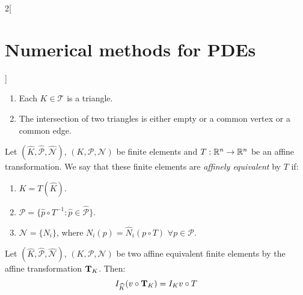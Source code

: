 \documentclass[../../../main_math.tex]{subfiles}
\begin{document}
\begin{multicols}{2}[\section{Numerical methods for PDEs}]
\begin{definition}
    \begin{enumerate}
      \item Each $K\in\mathcal{T}$ is a triangle.
      \item The intersection of two triangles is either empty or a common vertex or a common edge.
    \end{enumerate}
  \end{definition}
  \begin{definition}
    Let $(\widehat{K}, \widehat{\mathcal{P}}, \widehat{\mathcal{N}})$, $(K,\mathcal{P},\mathcal{N})$ be finite elements and $T:\mathbb{R}^n\to\mathbb{R}^n$ be an affine transformation. We say that these finite elements are \emph{affinely equivalent} by $T$ if:
    \begin{enumerate}
      \item $K=T(\widehat{K})$.
      \item $\mathcal{P}=\{\widehat{p}\circ T^{-1}:\widehat{p}\in\widehat{\mathcal{P}}\}$.
      \item $\mathcal{N}=\{N_i\}$, where $N_i(p)=\widehat{N}_i(p\circ T)$ $\forall p\in\mathcal{P}$.
    \end{enumerate}
  \end{definition}
  \begin{lemma}
    Let $(\widehat{K}, \widehat{\mathcal{P}}, \widehat{\mathcal{N}})$, $(K,\mathcal{P},\mathcal{N})$ be two affine equivalent finite elements by the affine transformation $\boldsymbol{\mathrm{T}}_K$. Then:
    $$
      I_{\widehat{K}}(v\circ \boldsymbol{\mathrm{T}}_K)=I_Kv\circ T
    $$
  \end{lemma}

\end{multicols}
\end{document}
